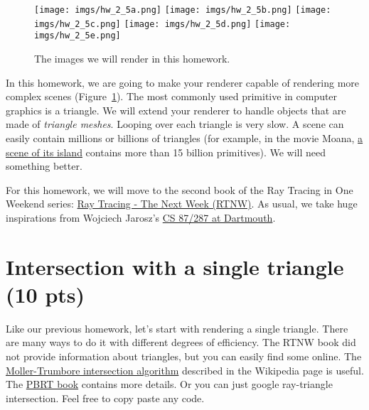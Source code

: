 




\begin{figure}[ht]
    \centering
    \texttt{[image: imgs/hw\_2\_5a.png]}
    \texttt{[image: imgs/hw\_2\_5b.png]}
    \texttt{[image: imgs/hw\_2\_5c.png]}
    \texttt{[image: imgs/hw\_2\_5d.png]}
    \texttt{[image: imgs/hw\_2\_5e.png]}
    \caption{The images we will render in this homework.}
    \label{fig:teaser}
\end{figure}

In this homework, we are going to make your renderer capable of rendering more complex scenes (Figure~\ref{fig:teaser}).
The most commonly used primitive in computer graphics is a triangle. We will extend your renderer to handle objects that are made of \emph{triangle meshes}. Looping over each triangle is very slow. A scene can easily contain millions or billions of triangles (for example, in the movie Moana, \href{https://www.disneyanimation.com/resources/moana-island-scene/}{a scene of its island} contains more than 15 billion primitives). We will need something better.

For this homework, we will move to the second book of the Ray Tracing in One Weekend series: \href{https://raytracing.github.io/books/RayTracingTheNextWeek.html}{Ray Tracing - The Next Week (RTNW)}. As usual, we take huge inspirations from Wojciech Jarosz's \href{https://cs87-dartmouth.github.io/Fall2022/assignments.html}{CS 87/287 at Dartmouth}.

\section{Intersection with a single triangle (10 pts)}
Like our previous homework, let's start with rendering a single triangle. There are many ways to do it with different degrees of efficiency. The RTNW book did not provide information about triangles, but you can easily find some online. The \href{https://en.wikipedia.org/wiki/M%C3%B6ller%E2%80%93Trumbore_intersection_algorithm}{Moller-Trumbore intersection algorithm} described in the Wikipedia page is useful. The \href{https://www.pbr-book.org/3ed-2018/Shapes/Triangle_Meshes#TriangleIntersection}{PBRT book} contains more details.
Or you can just google ray-triangle intersection.
Feel free to copy paste any code.

